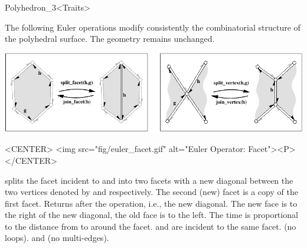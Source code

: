 \begin{ccRefClass}{Polyhedron_3<Traits>}







\label{sectionPolyhedronEuler}


The following Euler operations modify consistently the combinatorial
structure of the polyhedral surface. The geometry remains
unchanged.

\begin{ccTexOnly}
    \begin{center}
      \parbox{\textwidth}{%
          \includegraphics[width=\textwidth]{Polyhedron_ref/fig/euler}%
      }
    \end{center}
\end{ccTexOnly}

\begin{ccHtmlOnly}
    <CENTER>
    <img src="fig/euler_facet.gif" alt="Euler Operator: Facet"><P>
    </CENTER>
\end{ccHtmlOnly}


    {splits the facet incident to  and  into two facets
     with a new diagonal between the two vertices denoted by  and
      respectively. The second (new) facet is a copy of the
     first facet. Returns  after the
     operation, i.e., the new diagonal. The new face is to the right of the 
     new diagonal, the old face is to the left. The time is
     proportional to the distance from  to  around the facet.
    \ccPrecond {} and  are incident to the same facet.
                (no loops).  and
                (no multi-edges).}


\end{ccRefClass}
